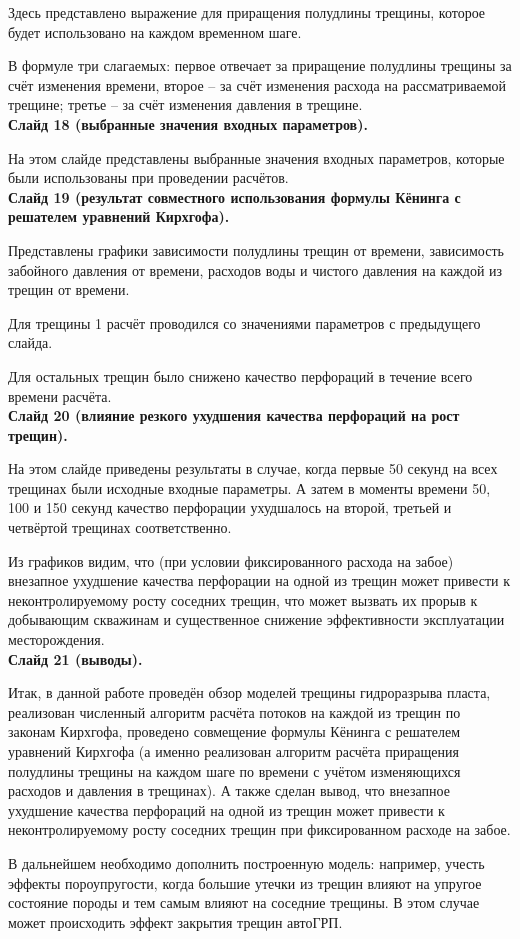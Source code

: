 \documentclass[a4paper, 12pt]{article}
\begin{document}
Здесь представлено выражение для приращения полудлины трещины, которое будет использовано на каждом временном шаге.

В формуле три слагаемых: первое отвечает за приращение полудлины трещины за счёт изменения времени, второе -- за счёт изменения расхода на рассматриваемой трещине; третье -- за счёт изменения давления в трещине.\\

\textbf{Слайд 18 (выбранные значения входных параметров).}

На этом слайде представлены выбранные значения входных параметров, которые были использованы при проведении расчётов.\\

\textbf{Слайд 19 (результат совместного использования формулы Кёнинга с решателем уравнений Кирхгофа).}

Представлены графики зависимости полудлины трещин от времени, зависимость забойного давления от времени, расходов воды и чистого давления на каждой из трещин от времени. 

Для трещины 1 расчёт проводился со значениями параметров с предыдущего слайда.

Для остальных трещин было снижено качество перфораций в течение всего времени расчёта.\\

\textbf{Слайд 20 (влияние резкого ухудшения качества перфораций на рост трещин).}

На этом слайде приведены результаты в случае, когда первые 50 секунд на всех трещинах были исходные входные параметры.
А затем в моменты времени 50, 100 и 150 секунд качество перфорации ухудшалось на второй, третьей и четвёртой трещинах соответственно.

Из графиков видим, что (при условии фиксированного расхода на забое) внезапное ухудшение качества перфорации на одной из трещин может привести к неконтролируемому росту соседних трещин, что может вызвать их прорыв к добывающим скважинам и существенное снижение эффективности эксплуатации месторождения.\\

\textbf{Слайд 21 (выводы).}

Итак, в данной работе проведён обзор моделей трещины гидроразрыва пласта, реализован численный алгоритм расчёта потоков на каждой из трещин по законам Кирхгофа, проведено совмещение формулы Кёнинга с решателем уравнений Кирхгофа (а именно реализован алгоритм расчёта приращения полудлины трещины на каждом шаге по времени с учётом изменяющихся расходов и давления в трещинах).
А также сделан вывод, что внезапное ухудшение качества перфораций на одной из трещин может привести к неконтролируемому росту соседних трещин при фиксированном расходе на забое.

В дальнейшем необходимо дополнить построенную модель: например, учесть эффекты пороупругости, когда большие утечки из трещин влияют на упругое состояние породы и тем самым влияют на соседние трещины.
В этом случае может происходить эффект закрытия трещин автоГРП.
\end{document}
